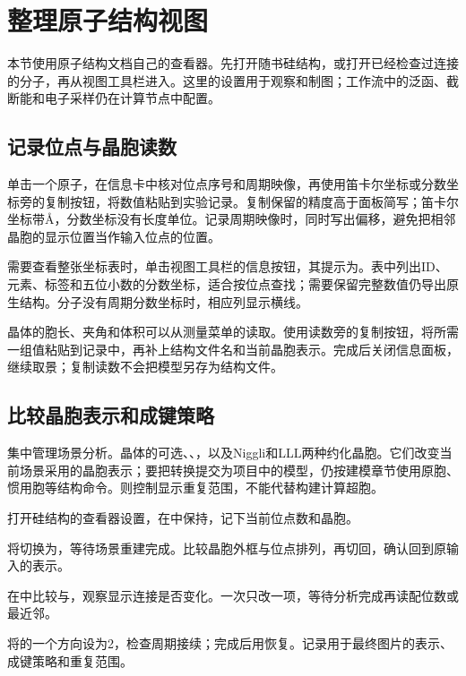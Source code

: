 \section{整理原子结构视图}

本节使用原子结构文档自己的查看器。先打开随书硅结构，或打开已经检查过连接的分子，再从视图工具栏进入。这里的设置用于观察和制图；工作流中的泛函、截断能和电子采样仍在计算节点中配置。

\subsection{记录位点与晶胞读数}

单击一个原子，在信息卡中核对位点序号和周期映像，再使用笛卡尔坐标或分数坐标旁的复制按钮，将数值粘贴到实验记录。复制保留的精度高于面板简写；笛卡尔坐标带\AA，分数坐标没有长度单位。记录周期映像时，同时写出偏移，避免把相邻晶胞的显示位置当作输入位点的位置。

需要查看整张坐标表时，单击视图工具栏的信息按钮，其提示为。表中列出ID、元素、标签和五位小数的分数坐标，适合按位点查找；需要保留完整数值仍导出原生结构。分子没有周期分数坐标时，相应列显示横线。

晶体的胞长、夹角和体积可以从测量菜单的读取。使用读数旁的复制按钮，将所需一组值粘贴到记录中，再补上结构文件名和当前晶胞表示。完成后关闭信息面板，继续取景；复制读数不会把模型另存为结构文件。

\subsection{比较晶胞表示和成键策略}

集中管理场景分析。晶体的可选、、，以及Niggli和LLL两种约化晶胞。它们改变当前场景采用的晶胞表示；要把转换提交为项目中的模型，仍按建模章节使用原胞、惯用胞等结构命令。则控制显示重复范围，不能代替构建计算超胞。

\begin{steps}
\item 打开硅结构的查看器设置，在中保持，记下当前位点数和晶胞。
\item 将切换为，等待场景重建完成。比较晶胞外框与位点排列，再切回，确认回到原输入的表示。
\item 在中比较与，观察显示连接是否变化。一次只改一项，等待分析完成再读配位数或最近邻。
\item 将的一个方向设为2，检查周期接续；完成后用恢复。记录用于最终图片的表示、成键策略和重复范围。
\end{steps}


